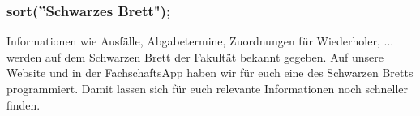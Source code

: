 \subsubsection{sort(''Schwarzes Brett");}
Informationen wie Ausfälle, Abgabetermine, Zuordnungen für 
Wiederholer, ... werden auf dem Schwarzen Brett der Fakultät bekannt 
gegeben. Auf unsere Website und in der FachschaftsApp haben wir 
für euch eine  des Schwarzen Bretts 
programmiert. Damit lassen sich für euch relevante Informationen noch 
schneller finden. 